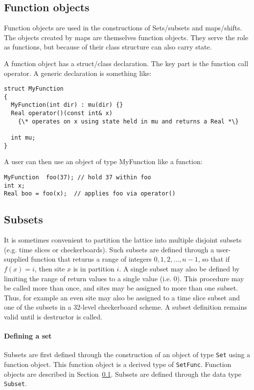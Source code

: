 \documentclass[12pt,letterpaper]{article}
\begin{document}
\subsection{Function objects}
\label{sec:funcobj}

Function objects are used in the constructions of Sets/subsets and
maps/shifts. The objects created by maps are themselves function
objects.  They serve the role as functions, but because of their class
structure can also carry state.

A function object has a struct/class declaration. The key part is
the function call operator. A generic declaration is something like:
%
\begin{verbatim}
struct MyFunction
{
  MyFunction(int dir) : mu(dir) {}
  Real operator()(const int& x)
    {\* operates on x using state held in mu and returns a Real *\}

  int mu;
}
\end{verbatim}

A user can then use an object of type MyFunction like a function:
%
\begin{verbatim}
MyFunction  foo(37); // hold 37 within foo
int x;
Real boo = foo(x);  // applies foo via operator()
\end{verbatim}


\subsection{Subsets}

It is sometimes convenient to partition the lattice into multiple
disjoint subsets (e.g. time slices or checkerboards).  Such subsets
are defined through a user-supplied function that returns a range of
integers $0,1,2,\ldots{},n-1$, so that if $f(x) = i$, then site $x$ is
in partition $i$.  A single subset may also be defined by limiting the
range of return values to a single value (i.e. 0).  This procedure may
be called more than once, and sites may be assigned to more than one
subset.  Thus, for example an even site may also be assigned to a time
slice subset and one of the subsets in a 32-level checkerboard scheme.
A subset definition remains valid until is destructor is called.

\paragraph{Defining a set}

Subsets are first defined through the construction of an object
of type \verb|Set| using a function object. This function object is
a derived type of \verb|SetFunc|. Function objects are described
in Section~\ref{sec:funcobj}. Subsets are defined through the 
data type \verb|Subset|.
\end{document}
